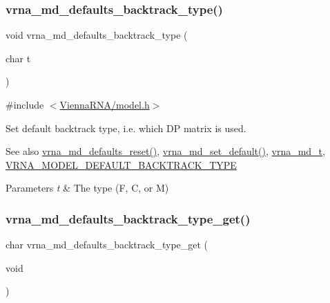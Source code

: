 \subsubsection{\texorpdfstring{vrna\+\_\+md\+\_\+defaults\+\_\+backtrack\+\_\+type()}{vrna\_md\_defaults\_backtrack\_type()}}
{\footnotesize\ttfamily void vrna\+\_\+md\+\_\+defaults\+\_\+backtrack\+\_\+type (\begin{DoxyParamCaption}\item[{char}]{t }\end{DoxyParamCaption})}



{\ttfamily \#include $<$\hyperlink{model_8h}{Vienna\+R\+N\+A/model.\+h}$>$}



Set default backtrack type, i.\+e. which DP matrix is used. 

\begin{DoxySeeAlso}{See also}
\hyperlink{group__model__details_ga70834424cf804d149937de89f80ceb45}{vrna\+\_\+md\+\_\+defaults\+\_\+reset()}, \hyperlink{group__model__details_ga8ac6ff84936282436f822644bf841f66}{vrna\+\_\+md\+\_\+set\+\_\+default()}, \hyperlink{group__model__details_ga1f8a10e12a0a1915f2a4eff0b28ea17c}{vrna\+\_\+md\+\_\+t}, \hyperlink{group__model__details_gad0e81fcaca53c4a826c68e0796de2afb}{V\+R\+N\+A\+\_\+\+M\+O\+D\+E\+L\+\_\+\+D\+E\+F\+A\+U\+L\+T\+\_\+\+B\+A\+C\+K\+T\+R\+A\+C\+K\+\_\+\+T\+Y\+PE} 
\end{DoxySeeAlso}

\begin{DoxyParams}{Parameters}
{\em t} & The type (\textquotesingle{}F\textquotesingle{}, \textquotesingle{}C\textquotesingle{}, or \textquotesingle{}M\textquotesingle{}) \\
\hline
\end{DoxyParams}
\mbox{\label{group__model__details_ga1425b4ebd0e034dead66d79becd64143}} 
\subsubsection{\texorpdfstring{vrna\+\_\+md\+\_\+defaults\+\_\+backtrack\+\_\+type\+\_\+get()}{vrna\_md\_defaults\_backtrack\_type\_get()}}
{\footnotesize\ttfamily char vrna\+\_\+md\+\_\+defaults\+\_\+backtrack\+\_\+type\+\_\+get (\begin{DoxyParamCaption}\item[{void}]{ }\end{DoxyParamCaption})}



